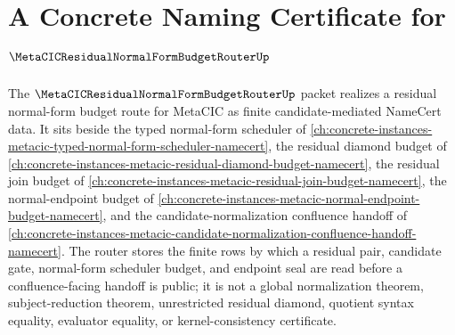 \chapter{A Concrete Naming Certificate for $\MetaCICResidualNormalFormBudgetRouterUp$}
\label{ch:concrete-instances-metacic-residual-normal-form-budget-router-namecert}

The $\MetaCICResidualNormalFormBudgetRouterUp$ packet realizes a residual normal-form budget route for MetaCIC as finite candidate-mediated NameCert data. It sits beside the typed normal-form scheduler of \autoref{ch:concrete-instances-metacic-typed-normal-form-scheduler-namecert}, the residual diamond budget of \autoref{ch:concrete-instances-metacic-residual-diamond-budget-namecert}, the residual join budget of \autoref{ch:concrete-instances-metacic-residual-join-budget-namecert}, the normal-endpoint budget of \autoref{ch:concrete-instances-metacic-normal-endpoint-budget-namecert}, and the candidate-normalization confluence handoff of \autoref{ch:concrete-instances-metacic-candidate-normalization-confluence-handoff-namecert}. The router stores the finite rows by which a residual pair, candidate gate, normal-form scheduler budget, and endpoint seal are read before a confluence-facing handoff is public; it is not a global normalization theorem, subject-reduction theorem, unrestricted residual diamond, quotient syntax equality, evaluator equality, or kernel-consistency certificate.

